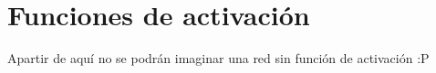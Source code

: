 \section{Funciones de activación}

Apartir de aquí no se podrán imaginar una red sin función de activación :P
